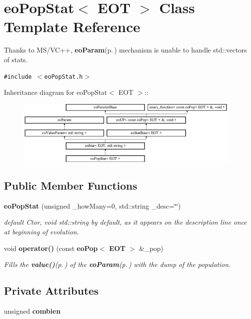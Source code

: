 \section{eo\-Pop\-Stat$<$ EOT $>$ Class Template Reference}
\label{classeo_pop_stat}
Thanks to MS/VC++, {\bf eo\-Param}{\rm (p.\,\pageref{classeo_param})} mechanism is unable to handle std::vectors of stats.  


{\tt \#include $<$eo\-Pop\-Stat.h$>$}

Inheritance diagram for eo\-Pop\-Stat$<$ EOT $>$::\begin{figure}[H]
\begin{center}
\leavevmode
\includegraphics[height=3.15315cm]{classeo_pop_stat}
\end{center}
\end{figure}
\subsection*{Public Member Functions}
\begin{CompactItemize}
\item 
{\bf eo\-Pop\-Stat} (unsigned \_\-how\-Many=0, std::string \_\-desc=\char`\"{}\char`\"{})
\begin{CompactList}\small\item\em default Ctor, void std::string by default, as it appears on the description line once at beginning of evolution. \item\end{CompactList}\item 
void {\bf operator()} (const {\bf eo\-Pop}$<$ {\bf EOT} $>$ \&\_\-pop)
\begin{CompactList}\small\item\em Fills the {\bf value()}{\rm (p.\,\pageref{classeo_value_param_a2})} of the {\bf eo\-Param}{\rm (p.\,\pageref{classeo_param})} with the dump of the population. \item\end{CompactList}\end{CompactItemize}
\subsection*{Private Attributes}
\begin{CompactItemize}
\item 
unsigned {\bf combien}\label{classeo_pop_stat_r0}

\end{CompactItemize}


